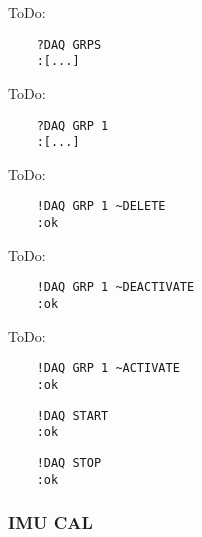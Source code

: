 \textcolor[rgb]{0.75,0.75,0.75}{ToDo:}
\begin{verbatim}
	?DAQ GRPS 
	:[...]
\end{verbatim}


\textcolor[rgb]{0.75,0.75,0.75}{ToDo:}
\begin{verbatim}
	?DAQ GRP 1
	:[...]
\end{verbatim}


\textcolor[rgb]{0.75,0.75,0.75}{ToDo:}
\begin{verbatim}
	!DAQ GRP 1 ~DELETE
	:ok
\end{verbatim}


\textcolor[rgb]{0.75,0.75,0.75}{ToDo:}
\begin{verbatim}
	!DAQ GRP 1 ~DEACTIVATE
	:ok
\end{verbatim}


\textcolor[rgb]{0.75,0.75,0.75}{ToDo:}
\begin{verbatim}
	!DAQ GRP 1 ~ACTIVATE
	:ok
\end{verbatim}


\begin{verbatim}
	!DAQ START
	:ok
\end{verbatim}


\begin{verbatim}
	!DAQ STOP
	:ok
\end{verbatim}



\subsubsection{IMU CAL}






